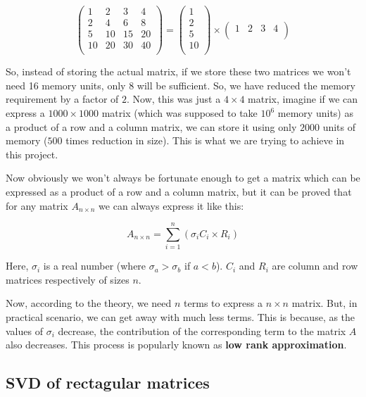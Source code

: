 		$$
		\left(
		\begin{matrix}
			1 & 2 & 3 & 4\\
			2 & 4 & 6 & 8\\
			5 & 10 & 15 & 20\\
			10 & 20 & 30 & 40\\
		\end{matrix}
		\right)=
		\left(
			\begin{matrix}
				1\\
				2\\
				5\\
				10\\
			\end{matrix}
		\right)\times
		\left(
			\begin{matrix}
				1 & 2 & 3 & 4\\
			\end{matrix}
		\right)
		$$

		So, instead of storing the actual matrix, if we store these two matrices we won't need 16 memory units, only $8$ will be sufficient. So, we have reduced the memory requirement by a factor of $2$. Now, this was just a $4\times4$ matrix, imagine if we can express a $1000\times1000$ matrix (which was supposed to take $10^6$ memory units) as a product of a row and a column matrix, we can store it using only $2000$ units of memory ($500$ times reduction in size). This is what we are trying to achieve in this project.

		Now obviously we won't always be fortunate enough to get a matrix which can be expressed as a product of a row and a column matrix, but it can be proved that for any matrix $A_{n\times n}$ we can always express it like this:

		$$A_{n\times n} = \sum_{i=1}^n (\sigma_iC_i\times R_i)$$

		Here, $\sigma_i$ is a real number (where $\sigma_a>\sigma_b$ if $a<b$). $C_i$ and $R_i$ are column and row matrices respectively of sizes $n$.

		Now, according to the theory, we need $n$ terms to express a $n\times n$ matrix. But, in practical scenario, we can get away with much less terms. This is because, as the values of $\sigma_i$ decrease, the contribution of the corresponding term to the matrix $A$ also decreases. This process is popularly known as \textbf{low rank approximation}.

	\subsection{SVD of rectagular matrices}

